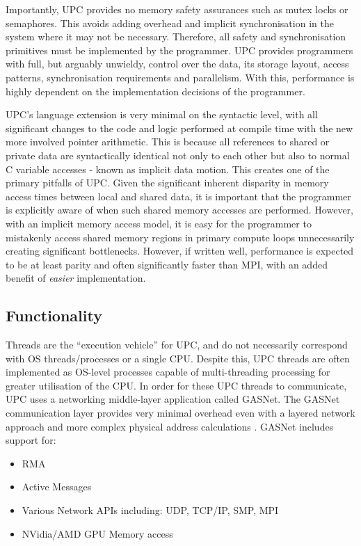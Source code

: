Importantly, UPC provides no memory safety assurances such as mutex locks or semaphores. This avoids adding overhead and implicit synchronisation in the system where it may not be necessary. Therefore, all safety and synchronisation primitives must be implemented by the programmer. UPC provides programmers with full, but arguably unwieldy, control over the data, its storage layout, access patterns, synchronisation requirements and parallelism. With this, performance is highly dependent on the implementation decisions of the programmer. 

UPC's language extension is very minimal on the syntactic level, with all significant changes to the code and logic performed at compile time with the new more involved pointer arithmetic. This is because all references to shared or private data are syntactically identical not only to each other but also to normal C variable accesses - known as implicit data motion. This creates one of the primary pitfalls of UPC. Given the significant inherent disparity in memory access times between local and shared data, it is important that the programmer is explicitly aware of when such shared memory accesses are performed. However, with an implicit memory access model, it is easy for the programmer to mistakenly access shared memory regions in primary compute loops unnecessarily creating significant bottlenecks. However, if written well, performance is expected to be at least parity and often significantly faster than MPI, with an added benefit of \textit{easier} implementation. %

\subsection{Functionality}
Threads are the ``execution vehicle'' for UPC, and do not necessarily correspond with OS threads/processes or a single CPU. Despite this, UPC threads are often implemented as OS-level processes capable of multi-threading processing for greater utilisation of the CPU. In order for these UPC threads to communicate, UPC uses a networking middle-layer application called GASNet. The GASNet communication layer provides very minimal overhead even with a layered network approach and more complex physical address calculations \cite{UPC_Performance}. GASNet includes support for:
\begin{itemize}
    \item RMA 
    \item Active Messages
    \item Various Network APIs including: UDP, TCP/IP, SMP, MPI
    \item NVidia/AMD GPU Memory access
\end{itemize}



